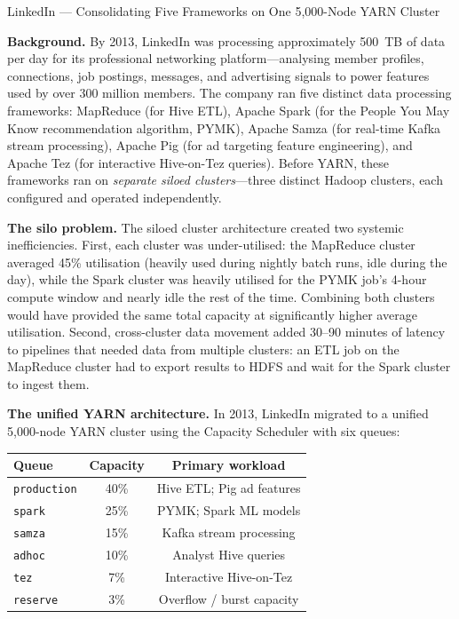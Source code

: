\begin{casestudy}{LinkedIn --- Consolidating Five Frameworks on One 5{,}000-Node YARN Cluster}

\textbf{Background.}
By 2013, LinkedIn was processing approximately 500~TB of data per day
for its professional networking platform---analysing member profiles,
connections, job postings, messages, and advertising signals to power
features used by over 300 million members. The company ran five distinct
data processing frameworks: MapReduce (for Hive ETL), Apache Spark
(for the People You May Know recommendation algorithm, PYMK), Apache
Samza (for real-time Kafka stream processing), Apache Pig (for ad
targeting feature engineering), and Apache Tez (for interactive
Hive-on-Tez queries). Before YARN, these frameworks ran on \emph{separate
siloed clusters}---three distinct Hadoop clusters, each configured and
operated independently.

\smallskip
\textbf{The silo problem.}
The siloed cluster architecture created two systemic inefficiencies.
First, each cluster was under-utilised: the MapReduce cluster averaged
45\% utilisation (heavily used during nightly batch runs, idle during
the day), while the Spark cluster was heavily utilised for the PYMK
job's 4-hour compute window and nearly idle the rest of the time.
Combining both clusters would have provided the same total capacity
at significantly higher average utilisation. Second, cross-cluster
data movement added 30--90 minutes of latency to pipelines that
needed data from multiple clusters: an ETL job on the MapReduce cluster
had to export results to HDFS and wait for the Spark cluster to ingest
them.

\smallskip
\textbf{The unified YARN architecture.}
In 2013, LinkedIn migrated to a unified 5{,}000-node YARN cluster using
the Capacity Scheduler with six queues:

\begin{center}
\begin{tabular}{lcc}
\toprule
\textbf{Queue}      & \textbf{Capacity} & \textbf{Primary workload} \\
\midrule
\texttt{production} & 40\%              & Hive ETL; Pig ad features \\
\texttt{spark}      & 25\%              & PYMK; Spark ML models \\
\texttt{samza}      & 15\%              & Kafka stream processing \\
\texttt{adhoc}      & 10\%              & Analyst Hive queries \\
\texttt{tez}        & 7\%               & Interactive Hive-on-Tez \\
\texttt{reserve}    & 3\%               & Overflow / burst capacity \\
\bottomrule
\end{tabular}
\end{center}


\end{casestudy}
